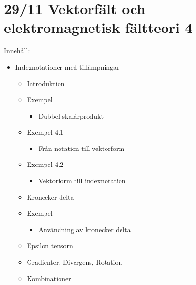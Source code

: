 \section{29/11 \quad Vektorfält och elektromagnetisk fältteori \quad \textcircled{4}}

Innehåll:
\begin{itemize}[label=--]
  \item Indexnotationer med tillämpningar
  \begin{itemize}[label=+]
    \item Introduktion
    \item Exempel
    \begin{itemize}[label=--]
      \item Dubbel skalärprodukt
    \end{itemize}
    \item Exempel 4.1
    \begin{itemize}[label=--]
      \item Från notation till vektorform
    \end{itemize}
    \item Exempel 4.2
    \begin{itemize}[label=--]
      \item Vektorform till indexnotation
    \end{itemize}
    \item Kronecker delta
    \item Exempel
    \begin{itemize}[label=--]
      \item Användning av kronecker delta
    \end{itemize}
    \item Epsilon tensorn
    \item Gradienter, Divergens, Rotation
    \item Kombinationer
  \end{itemize}
\end{itemize}
